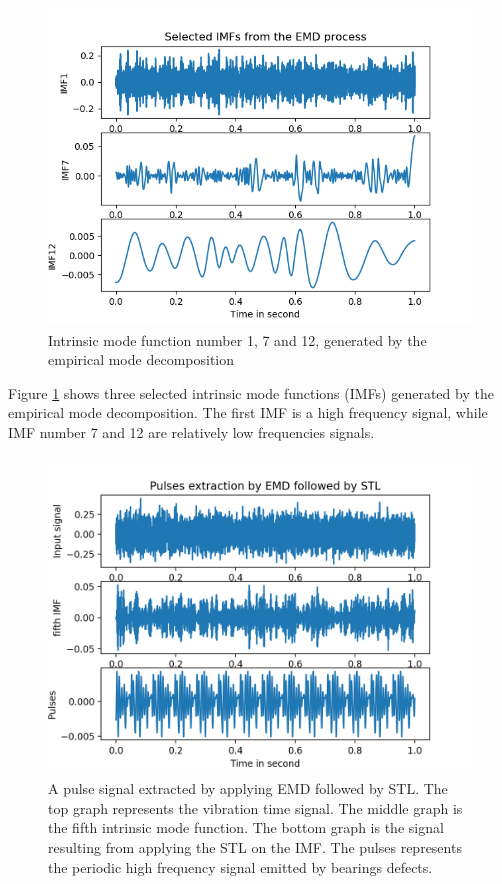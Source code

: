 \documentclass[../Main/thesis.tex]{subfiles}
\begin{document}
\begin{figure}[H] %
	\centering
	\includegraphics[width=6in]{../fig/selected_imf.png} 
	\caption{Intrinsic mode function number 1, 7 and 12, generated by the empirical mode decomposition}
	\label{fig:imf}
\end{figure}
\justify
Figure \ref{fig:imf} shows three selected intrinsic mode functions (IMFs) generated by the empirical mode decomposition. The first IMF is a high frequency signal, while IMF number 7 and 12 are relatively low frequencies signals.
\begin{figure}[H] %
   \centering
   \includegraphics[width=6in]{../fig/emd-stl.png} 
   \caption{ A pulse signal extracted by applying EMD followed by STL. The top graph represents the vibration time signal. The middle graph is the fifth intrinsic mode function. The bottom graph is the signal resulting from applying the STL on the IMF. The pulses represents the periodic high frequency signal emitted by bearings defects.}
   \label{fig:emd-stl}
\end{figure}
\end{document}
